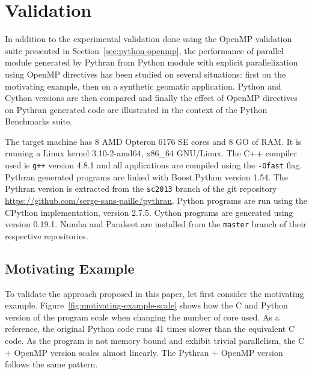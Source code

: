 \documentclass[conference]{IEEEtran}
\begin{document}
\section{Validation}\label{sec:validation}

In addition to the experimental validation done using the OpenMP validation
suite presented in Section~\ref{sec:python-openmp}, the performance of parallel
module generated by Pythran from Python module with explicit parallelization
using OpenMP directives has been studied on several situations: first on the
motivating example, then on a synthetic geomatic application. Python and Cython
versions are then compared and finally the effect of OpenMP directives on
Pythran generated code are illustrated in the context of the Python Benchmarks
suite.

The target machine has  8 AMD Opteron 6176 SE cores and 8 GO of RAM. It is
running a Linux kernel 3.10-2-amd64, x86\_64 GNU/Linux. The C++ compiler used is
\texttt{g++} version 4.8.1 and all applications are compiled using the
\texttt{-Ofast} flag. Pythran generated programs are linked with Boost.Python
version 1.54. The Pythran version is extracted from the \texttt{sc2013} branch
of the git repository \url{https://github.com/serge-sans-paille/pythran}. Python
programs are run using the CPython implementation, version 2.7.5. Cython
programs are generated using version 0.19.1. Numba and Parakeet are installed
from the \texttt{master} branch of their respective repositories.

\subsection{Motivating Example}

To validate the approach proposed in this paper, let first consider the
motivating example. Figure~\ref{fig:motivating-example-scale} shows how the C
and Python version of the program scale when changing the number of core used.
As a reference, the original Python code runs 41 times slower than the
equivalent C code. As the program is not memory bound and exhibit trivial
parallelism, the C + OpenMP version scales almost linearly. The Pythran + OpenMP
version follows the same pattern.
\end{document}
